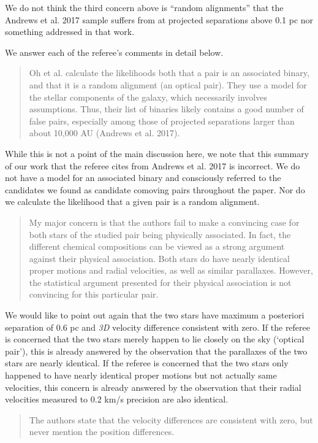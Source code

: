 \documentclass[12pt]{article}
\begin{document}
We do not think the third concern above is ``random alignments'' that the
Andrews et al. 2017 sample suffers from at projected separations above 0.1 pc
nor something addressed in that work.

We answer each of {\sf the referee's comments} in detail below.

\begin{quote}
Oh et al. calculate the likelihoods both that a pair is an associated
binary, and that it is a random alignment (an optical pair). They use a
model for the stellar components of the galaxy, which necessarily
involves assumptions. Thus, their list of binaries likely contains a
good number of false pairs, especially among those of projected
separations larger than about 10,000 AU (Andrews et al. 2017).
\end{quote}

While this is not a point of the main discussion here, we note that this
summary of our work that the referee cites from Andrews et al. 2017 is
incorrect. We do not have a model for an associated binary and
consciously referred to the candidates we found as candidate comoving pairs
throughout the paper.
Nor do we calculate the likelihood that a given pair is a random alignment.

\begin{quote}
My major concern is that the authors fail to make a convincing case for
both stars of the studied pair being physically associated. In fact, the
different chemical compositions can be viewed as a strong argument
against their physical association. Both stars do have nearly identical
proper motions and radial velocities, as well as similar parallaxes.
However, the statistical argument presented for their physical
association is not convincing for this particular pair.
\end{quote}

We would like to point out again that the two stars have maximum a
posteriori separation of 0.6 pc and \emph{3D} velocity difference
consistent with zero. If the referee is concerned that the two stars
merely happen to lie closely on the sky (`optical pair'), this is already
answered by the observation that the parallaxes of the two stars are
nearly identical. If the referee is concerned that the two stars only
happened to have nearly identical proper motions but not actually same
velocities, this concern is already answered by the observation that
their radial velocities measured to 0.2 km/s precision are also
identical.

\begin{quote}
The authors state that the velocity differences are consistent with
zero, but never mention the position differences.
\end{quote}
\end{document}

